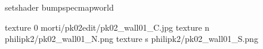 setshader bumpspecmapworld

texture 0 morti/pk02edit/pk02_wall01_C.jpg
texture n philipk2/pk02_wall01_N.png
texture s philipk2/pk02_wall01_S.png

